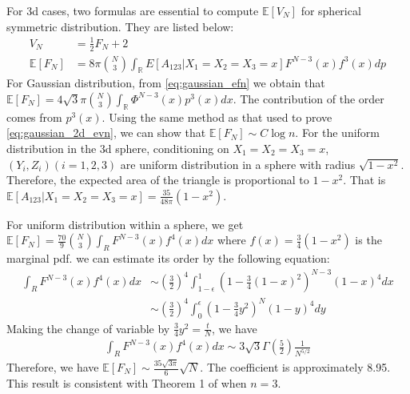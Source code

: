 \documentclass{article}
\def\E{\mathbb{E}}
\def\R{\mathbb{R}}
\begin{document}
For 3d cases, two formulas are essential to compute $\E[V_N]$
for spherical symmetric distribution.
They are listed below:
\begin{align}
    V_N &= \frac{1}{2} F_N + 2 \\
    \E[F_N]&=8\pi \binom{N}{3}
    \int_{\R} 
    E[A_{123}|X_1=X_2=X_3=x] F^{N-3}(x)
    f^3(x) dp\label{eq:gaussian_efn}
\end{align}
For Gaussian distribution, from \eqref{eq:gaussian_efn}
we obtain that $\E[F_N]
= 4\sqrt{3}\pi \binom{N}{3}\int_{\R} \Phi^{N-3}(x)p^3(x)dx$.
The contribution of the order comes from $p^3(x)$.
Using the same method as that used to prove \eqref{eq:gaussian_2d_evn},
we can show that
$\E[F_N] \sim C\log n$. For the uniform
distribution in the 3d sphere, conditioning on $X_1=X_2=X_3=x$,
$(Y_i, Z_i) (i=1,2,3)$
are uniform distribution in a sphere with
radius $\sqrt{1-x^2}$. Therefore, the expected
area of the triangle is proportional to $1-x^2$.
That is
$\E[A_{123}|X_1=X_2=X_3=x] = \frac{35}{48 \pi}(1-x^2)$.

For uniform distribution
within a sphere,
we get
$\E[F_N]
=\frac{70}{9}
\binom{N}{3}
\int_R F^{N-3}(x)f^4(x)dx$
where $f(x)=\frac{3}{4}(1-x^2)$ is the
marginal pdf.
we can estimate its order by
the following equation:
\begin{align*}
    \int_R F^{N-3}(x)f^4(x)dx
    &\sim (\frac{3}{2})^4
    \int_{1-\epsilon}^{1}
    (1-\frac{3}{4}(1-x)^2)^{N-3}
    (1-x)^4dx \\
    &\sim  (\frac{3}{2})^4
    \int_{0}^{\epsilon}
    (1-\frac{3}{4}y^2)^{N}
    (1-y)^4dy
\end{align*}
Making the change of variable by $\frac{3}{4}y^2=\frac{t}{N}$,
we have
\begin{align*}
    \int_R F^{N-3}(x)f^4(x)dx
    \sim 3\sqrt{3}\Gamma(\frac{5}{2})\frac{1}{N^{5/2}}
\end{align*}
Therefore, we have
$\E[F_N] \sim \frac{35\sqrt{3\pi}}{6}\sqrt{N}$.
The coefficient is approximately 8.95.
This result is consistent with
Theorem 1 of \cite{raynaud1970enveloppe}
when $n=3$.
\end{document}
